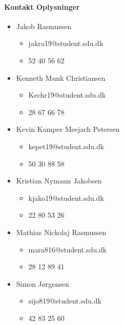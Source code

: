 \paragraph{Kontakt Oplysninger}
\begin{itemize}
    \item Jakob Rasmussen
    \begin{itemize}
        \item jakra19@student.sdu.dk
        \item 52 40 56 62
    \end{itemize}
    \item Kenneth Munk Christiansen
        \begin{itemize}
        \item Kechr19@student.sdu.dk
        \item 28 67 66 78
    \end{itemize}
    \item Kevin Kamper Meejach Petersen
        \begin{itemize}
        \item kepet19@student.sdu.dk
        \item 50 30 88 58
    \end{itemize}
    \item Kristian Nymann Jakobsen
        \begin{itemize}
        \item kjako19@student.sdu.dk
        \item 22 80 53 26
    \end{itemize}
    \item Mathias Nickolaj Rasmussen
        \begin{itemize}
        \item mara816@student.sdu.dk
        \item 28 12 89 41
    \end{itemize}
    \item Simon Jørgensen
        \begin{itemize}
        \item sijo819@student.sdu.dk
        \item 42 83 25 60
    \end{itemize}
\end{itemize}